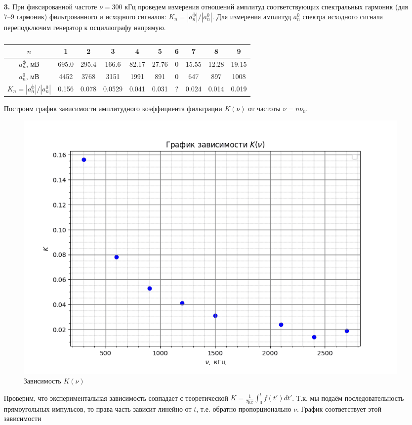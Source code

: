 \documentclass[a4paper,12pt]{article}
\begin{document}
\begin{enumerate}
\item [\textbf{3.}]
При фиксированной частоте $\nu = 300$ кГц проведем измерения отношений амплитуд соответствующих спектральных гармоник (для 7–9 гармоник) фильтрованного и исходного сигналов: $K_n = |a_n^\text{ф}|/|a_n^0|$. Для измерения
амплитуд $a_n^0$ спектра исходного сигнала переподключим генератор к осциллографу напрямую.

\begin{table}[h!]
    \centering
    \begin{tabular}{|c|c|c|c|c|c|c|c|c|c|}
\hline
$n$ & 1 & 2 & 3 & 4 & 5 & 6 & 7 & 8 & 9 \\ \hline
$a_n^\text{ф}$, мВ & 695.0 & 295.4 & 166.6 & 82.17 & 27.76 & 0 & 15.55 & 12.28 & 19.15 \\ \hline
$a_n^0$, мВ & 4452 & 3768 & 3151 & 1991 & 891 & 0 & 647 & 897 & 1008 \\ \hline
$K_n = |a_n^\text{ф}|/|a_n^0|$ & 0.156 & 0.078 & 0.0529 & 0.041 & 0.031 & ? & 0.024 &0.014 & 0.019 \\ \hline
\end{tabular}
    \caption{}
    \label{table4}
\end{table}

Построим график зависимости амплитудного коэффициента фильтрации $K(\nu)$ от частоты $\nu = n\nu_0$.
\begin{figure}[h]
    \centering
    \includegraphics[width=0.7\linewidth]{K(nu).png}
    \caption{Зависимость $K(\nu)$}
    \label{grafic3}
\end{figure}





Проверим, что экспериментальная зависимость
совпадает с теоретической $K = \frac{1}{\tau_\text{RC}} \int_0^t f(t')dt'$. Т.к. мы подаём последовательность прямоугольных импульсов, то права часть зависит линейно от $t$, т.е. обратно пропорционально $\nu$. График соответствует этой зависимости









\end{enumerate}
\end{document}
